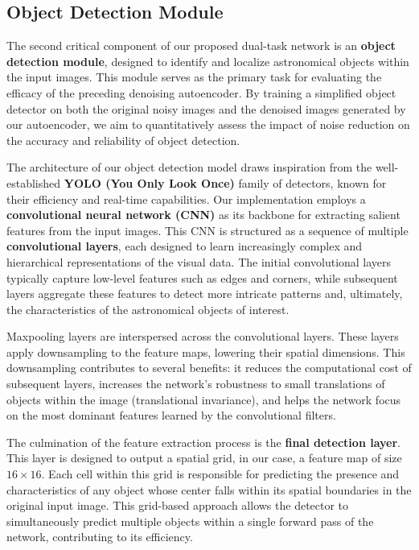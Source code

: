 \documentclass[12pt, conference]{IEEEtran}
\begin{document}
\subsection{Object Detection Module}
The second critical component of our proposed dual-task network is an \textbf{object detection module}, designed to identify and localize astronomical objects within the input images. This module serves as the primary task for evaluating the efficacy of the preceding denoising autoencoder. By training a simplified object detector on both the original noisy images and the denoised images generated by our autoencoder, we aim to quantitatively assess the impact of noise reduction on the accuracy and reliability of object detection.

The architecture of our object detection model draws inspiration from the well-established \textbf{YOLO \cite{redmon2016you} (You Only Look Once)} family of detectors, known for their efficiency and real-time capabilities. Our implementation employs a \textbf{convolutional neural network (CNN)} as its backbone for extracting salient features from the input images. This CNN is structured as a sequence of multiple \textbf{convolutional layers}, each designed to learn increasingly complex and hierarchical representations of the visual data. The initial convolutional layers typically capture low-level features such as edges and corners, while subsequent layers aggregate these features to detect more intricate patterns and, ultimately, the characteristics of the astronomical objects of interest.

Maxpooling layers are interspersed across the convolutional layers. These layers apply downsampling to the feature maps, lowering their spatial dimensions. This downsampling contributes to several benefits: it reduces the computational cost of subsequent layers, increases the network's robustness to small translations of objects within the image (translational invariance), and helps the network focus on the most dominant features learned by the convolutional filters.

The culmination of the feature extraction process is the \textbf{final detection layer}. This layer is designed to output a spatial grid, in our case, a feature map of size $16 \times 16$. Each cell within this grid is responsible for predicting the presence and characteristics of any object whose center falls within its spatial boundaries in the original input image. This grid-based approach allows the detector to simultaneously predict multiple objects within a single forward pass of the network, contributing to its efficiency.
\end{document}
